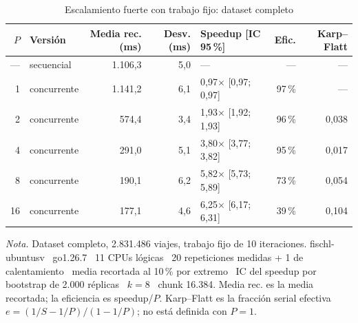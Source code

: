 \begin{table}[H]
\caption{Escalamiento fuerte con trabajo fijo: dataset completo}\label{tab:speedup-fuerte}
\footnotesize
\begin{tabular}{@{}rlrrlrr@{}}
\toprule
\textbf{$P$} & \textbf{Versión} & \textbf{Media rec. (ms)} & \textbf{Desv. (ms)} & \textbf{Speedup [IC 95\,\%]} & \textbf{Efic.} & \textbf{Karp--Flatt} \\
\midrule
--- & secuencial & 1.106,3 & 5,0 & --- & --- & --- \\
1 & concurrente & 1.141,2 & 6,1 & 0,97$\times$ [0,97; 0,97] & 97\,\% & --- \\
2 & concurrente & 574,4 & 3,4 & 1,93$\times$ [1,92; 1,93] & 96\,\% & 0,038 \\
4 & concurrente & 291,0 & 5,1 & 3,80$\times$ [3,77; 3,82] & 95\,\% & 0,017 \\
8 & concurrente & 190,1 & 6,2 & 5,82$\times$ [5,73; 5,89] & 73\,\% & 0,054 \\
16 & concurrente & 177,1 & 4,6 & 6,25$\times$ [6,17; 6,31] & 39\,\% & 0,104 \\
\bottomrule
\end{tabular}

{\footnotesize\textit{Nota.} Dataset completo, 2.831.486 viajes, trabajo fijo de 10 iteraciones. fischl-ubuntusv \textperiodcentered\ go1.26.7 \textperiodcentered\ 11 CPUs lógicas \textperiodcentered\ 20 repeticiones medidas + 1 de calentamiento \textperiodcentered\ media recortada al 10\,\% por extremo \textperiodcentered\ IC del speedup por bootstrap de 2.000 réplicas \textperiodcentered\ $k=8$ \textperiodcentered\ chunk 16.384. Media rec. es la media recortada; la eficiencia es speedup/$P$. Karp--Flatt es la fracción serial efectiva $e = (1/S - 1/P)/(1 - 1/P)$; no está definida con $P = 1$.\par}
\end{table}
